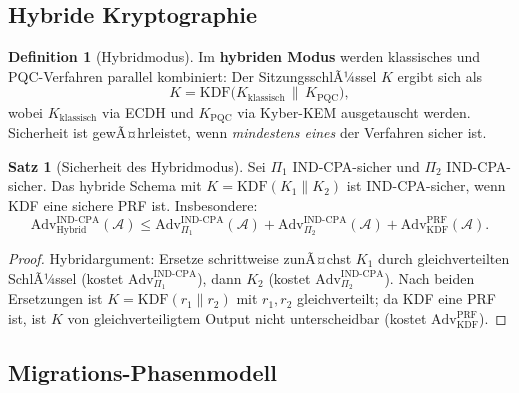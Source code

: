 ﻿\documentclass[a4paper,12pt]{article}
\theoremstyle{definition}
\newtheorem{definition}{Definition}[section]
\newtheorem{satz}{Satz}[section]
\begin{document}
\subsection{Hybride Kryptographie}

\begin{definition}[Hybridmodus]
Im \textbf{hybriden Modus} werden klassisches und PQC-Verfahren parallel
kombiniert: Der SitzungsschlÃ¼ssel $K$ ergibt sich als
\[
  K = \mathrm{KDF}\bigl(K_\mathrm{klassisch} \,\|\, K_\mathrm{PQC}\bigr),
\]
wobei $K_\mathrm{klassisch}$ via ECDH und $K_\mathrm{PQC}$ via Kyber-KEM
ausgetauscht werden. Sicherheit ist gewÃ¤hrleistet, wenn \emph{mindestens eines}
der Verfahren sicher ist.
\end{definition}

\begin{satz}[Sicherheit des Hybridmodus]
Sei $\Pi_1$ IND-CPA-sicher und $\Pi_2$ IND-CPA-sicher. Das hybride Schema
mit $K = \mathrm{KDF}(K_1 \| K_2)$ ist IND-CPA-sicher, wenn KDF
eine sichere PRF ist. Insbesondere:
\[
  \mathrm{Adv}^{\mathrm{IND\text{-}CPA}}_{\mathrm{Hybrid}}(\mathcal{A})
  \leq \mathrm{Adv}^{\mathrm{IND\text{-}CPA}}_{\Pi_1}(\mathcal{A})
  + \mathrm{Adv}^{\mathrm{IND\text{-}CPA}}_{\Pi_2}(\mathcal{A})
  + \mathrm{Adv}^{\mathrm{PRF}}_{\mathrm{KDF}}(\mathcal{A}).
\]
\end{satz}

\begin{proof}
Hybridargument: Ersetze schrittweise zunÃ¤chst $K_1$ durch gleichverteilten
SchlÃ¼ssel (kostet $\mathrm{Adv}^{\mathrm{IND\text{-}CPA}}_{\Pi_1}$),
dann $K_2$ (kostet $\mathrm{Adv}^{\mathrm{IND\text{-}CPA}}_{\Pi_2}$).
Nach beiden Ersetzungen ist $K = \mathrm{KDF}(r_1 \| r_2)$ mit $r_1, r_2$
gleichverteilt; da KDF eine PRF ist, ist $K$ von gleichverteiligtem Output nicht
unterscheidbar (kostet $\mathrm{Adv}^{\mathrm{PRF}}_{\mathrm{KDF}}$).
\end{proof}

\subsection{Migrations-Phasenmodell}
\end{document}
